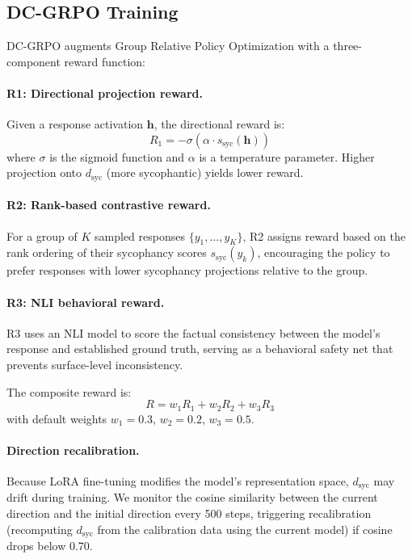 \documentclass[11pt,a4paper]{article}
\newcommand{\dsyc}{$d_{\text{syc}}$}
\begin{document}
\subsection{DC-GRPO Training}
\label{sec:dcgrpo}

DC-GRPO augments Group Relative Policy Optimization with a three-component reward function:

\paragraph{R1: Directional projection reward.} Given a response activation $\mathbf{h}$, the directional reward is:
\begin{equation}
    R_1 = -\sigma(\alpha \cdot s_{\text{syc}}(\mathbf{h}))
\end{equation}
where $\sigma$ is the sigmoid function and $\alpha$ is a temperature parameter. Higher projection onto \dsyc{} (more sycophantic) yields lower reward.

\paragraph{R2: Rank-based contrastive reward.} For a group of $K$ sampled responses $\{y_1, \ldots, y_K\}$, R2 assigns reward based on the rank ordering of their sycophancy scores $s_{\text{syc}}(y_k)$, encouraging the policy to prefer responses with lower sycophancy projections relative to the group.

\paragraph{R3: NLI behavioral reward.} R3 uses an NLI model to score the factual consistency between the model's response and established ground truth, serving as a behavioral safety net that prevents surface-level inconsistency.

The composite reward is:
\begin{equation}
    R = w_1 R_1 + w_2 R_2 + w_3 R_3
\end{equation}
with default weights $w_1 = 0.3$, $w_2 = 0.2$, $w_3 = 0.5$.

\paragraph{Direction recalibration.} Because LoRA fine-tuning modifies the model's representation space, \dsyc{} may drift during training. We monitor the cosine similarity between the current direction and the initial direction every 500 steps, triggering recalibration (recomputing \dsyc{} from the calibration data using the current model) if cosine drops below 0.70.
\end{document}

